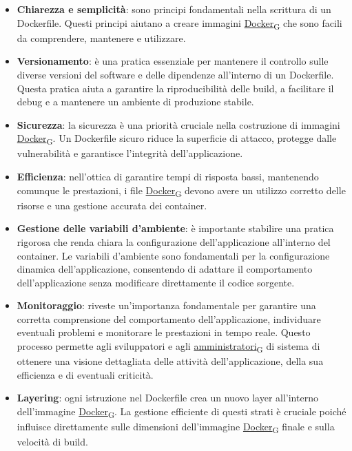 \begin{itemize}
	\item \textbf{Chiarezza e semplicità}: sono principi fondamentali nella scrittura di un Dockerfile. Questi principi aiutano a creare immagini \href{https://7last.github.io/docs/rtb/documentazione-interna/glossario\#docker}{Docker\textsubscript{G}} che sono facili da comprendere, mantenere e utilizzare.
	\item \textbf{Versionamento}: è una pratica essenziale per mantenere il controllo sulle diverse versioni del software e delle dipendenze all'interno di un Dockerfile. Questa pratica aiuta a garantire la riproducibilità delle build, a facilitare il debug e a mantenere un ambiente di produzione stabile.
	\item \textbf{Sicurezza}: la sicurezza è una priorità cruciale nella costruzione di immagini \href{https://7last.github.io/docs/rtb/documentazione-interna/glossario\#docker}{Docker\textsubscript{G}}. Un Dockerfile sicuro riduce la superficie di attacco, protegge dalle vulnerabilità e garantisce l'integrità dell'applicazione.
	\item \textbf{Efficienza}: nell'ottica di garantire tempi di risposta bassi, mantenendo comunque le prestazioni, i file \href{https://7last.github.io/docs/rtb/documentazione-interna/glossario\#docker}{Docker\textsubscript{G}} devono avere un utilizzo corretto delle risorse e una gestione accurata dei container.
	\item \textbf{Gestione delle variabili d'ambiente}: è importante stabilire una pratica rigorosa che renda chiara la configurazione dell'applicazione all'interno del container. Le variabili d'ambiente sono fondamentali per la configurazione dinamica dell'applicazione, consentendo di adattare il comportamento dell'applicazione senza modificare direttamente il codice sorgente.
	\item \textbf{Monitoraggio}: riveste un'importanza fondamentale per garantire una corretta comprensione del comportamento dell'applicazione, individuare eventuali problemi e monitorare le prestazioni in tempo reale. Questo processo permette agli sviluppatori e agli \href{https://7last.github.io/docs/rtb/documentazione-interna/glossario\#amministratore}{amministratori\textsubscript{G}} di sistema di ottenere una visione dettagliata delle attività dell'applicazione, della sua efficienza e di eventuali criticità.
	\item \textbf{Layering}: ogni istruzione nel Dockerfile crea un nuovo layer all'interno dell'immagine \href{https://7last.github.io/docs/rtb/documentazione-interna/glossario\#docker}{Docker\textsubscript{G}}. La gestione efficiente di questi strati è cruciale poiché influisce direttamente sulle dimensioni dell'immagine \href{https://7last.github.io/docs/rtb/documentazione-interna/glossario\#docker}{Docker\textsubscript{G}} finale e sulla velocità di build.

\end{itemize}
